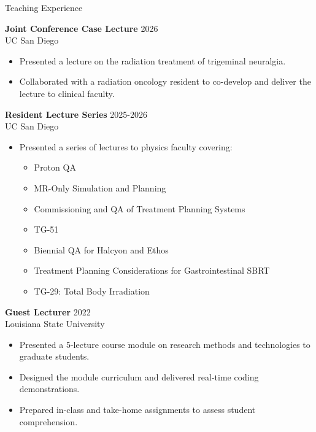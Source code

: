 \documentclass[
	11pt, %
]{resume} %
\begin{document}

\begin{rSection}{Teaching Experience}

	\textbf{Joint Conference Case Lecture} \hfill 2026 \\
	UC San Diego
	\vspace{-.2cm}
	\begin{itemize}[label=$\cdot$]
		\itemsep-0.5em
		\item Presented a lecture on the radiation treatment of trigeminal neuralgia.
		\item Collaborated with a radiation oncology resident to co-develop and deliver the lecture to clinical faculty.
	\end{itemize}

	\textbf{Resident Lecture Series} \hfill 2025-2026 \\
	UC San Diego
	\vspace{-.2cm}
	\begin{itemize}[label=$\cdot$]
		\itemsep-0.5em
		\item Presented a series of lectures to physics faculty covering:
		\vspace{-.2cm}
		\begin{itemize}[label=$\circ$]
			\itemsep-0.5em
			\item Proton QA
			\item MR-Only Simulation and Planning
			\item Commissioning and QA of Treatment Planning Systems
			\item TG-51
			\item Biennial QA for Halcyon and Ethos
			\item Treatment Planning Considerations for Gastrointestinal SBRT
			\item TG-29: Total Body Irradiation
		\end{itemize}
	\end{itemize}

	\textbf{Guest Lecturer} \hfill 2022 \\
	Louisiana State University
	\vspace{-.2cm}
	\begin{itemize}[label=$\cdot$]
		\itemsep-0.5em
		\item Presented a 5-lecture course module on research methods and technologies to graduate students.
		\item Designed the module curriculum and delivered real-time coding demonstrations.
		\item Prepared in-class and take-home assignments to assess student comprehension.
	\end{itemize}


\end{rSection}
\end{document}
